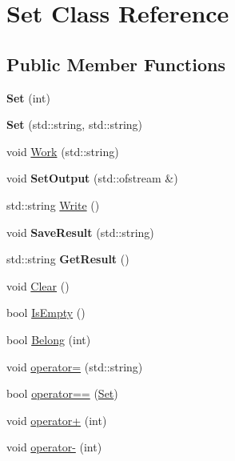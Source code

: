 \hypertarget{classSet}{}\section{Set Class Reference}
\label{classSet}
\subsection*{Public Member Functions}
\begin{DoxyCompactItemize}
\item 
\mbox{\label{classSet_a545e44270dff7f873f7203aa5c6ca3a1}} 
{\bfseries Set} (int)
\item 
\mbox{\label{classSet_a9387dcd9189f0b036d731cf4f169de05}} 
{\bfseries Set} (std\+::string, std\+::string)
\item 
void \hyperlink{classSet_aa25ad5b9d72e4d428eb564b2eb208e3b}{Work} (std\+::string)
\item 
\mbox{\label{classSet_acc57a5a86498c7efb365b4dfbf1fd247}} 
void {\bfseries Set\+Output} (std\+::ofstream \&)
\item 
std\+::string \hyperlink{classSet_afc0f35a8d6903b892bb283813511fea9}{Write} ()
\item 
\mbox{\label{classSet_af72ca387c44c1768ec7c7ec4e9a94f37}} 
void {\bfseries Save\+Result} (std\+::string)
\item 
\mbox{\label{classSet_afa9c6e6f6b0dedc1a397a0f8a85fc3a6}} 
std\+::string {\bfseries Get\+Result} ()
\item 
void \hyperlink{classSet_abe5c5439f3665baba2da0b1f1a4c03fd}{Clear} ()
\item 
bool \hyperlink{classSet_a0361a3a2b7a408514a259b326245cbc7}{Is\+Empty} ()
\item 
bool \hyperlink{classSet_a8fb9899afe9a09628706cf539cc75a1c}{Belong} (int)
\item 
void \hyperlink{classSet_a7f28cadb13f4cc86a87f64b9f885877a}{operator=} (std\+::string)
\item 
bool \hyperlink{classSet_a3087ba7a27e33fbb1b2a091c405ba046}{operator==} (\hyperlink{classSet}{Set})
\item 
void \hyperlink{classSet_a33786bba5f634c5023d047b5f1f1a292}{operator+} (int)
\item 
void \hyperlink{classSet_a1e58afdc9befac1dbe295a0bdccfeacb}{operator-\/} (int)

\end{DoxyCompactItemize}
